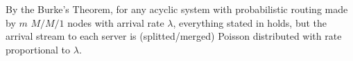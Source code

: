 By the Burke's Theorem, for any acyclic system with probabilistic routing made by $m$ $M/M/1$ nodes with arrival rate $\lambda$, everything stated in  holds, but the arrival stream to each server is (splitted/merged) Poisson distributed with rate proportional to $\lambda$.

